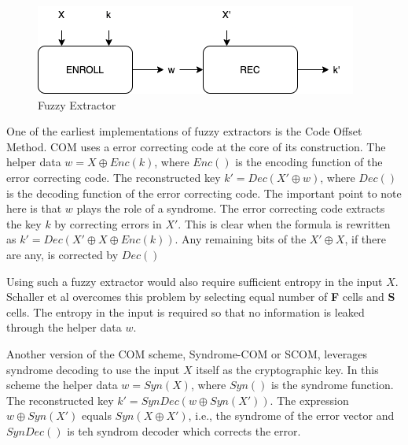 \documentclass[journal, a4paper]{IEEEtran}
\begin{document}
\begin{figure}[!hbt]
    \begin{center}
    \includegraphics[scale=0.45]{figs/COM.png}
    \caption{Fuzzy Extractor}
    \label{fig:tf_plot}
    \end{center}
\end{figure}

One of the earliest implementations of fuzzy extractors is the Code Offset Method. \cite{COM} COM uses a error correcting code at the core of its construction. The helper data \(w = X \oplus Enc(k)\), where \(Enc()\) is the encoding function of the error correcting code. The reconstructed key \(k' = Dec(X' \oplus w)\), where \(Dec()\) is the decoding function of the error correcting code. The important point to note here is that \(w\) plays the role of a syndrome. The error correcting code extracts the key \(k\) by correcting errors in \(X'\). This is clear when the formula is rewritten as \(k' = Dec(X' \oplus X \oplus Enc(k))\). Any remaining bits of the \(X' \oplus X\), if there are any, is corrected by \(Dec()\)

Using such a fuzzy extractor would also require sufficient entropy in the input \(X\). Schaller et al overcomes this problem by selecting equal number of \textbf{F} cells and \textbf{S} cells. The entropy in the input is required so that no information is leaked through the helper data \(w\).

Another version of the COM scheme, Syndrome-COM or SCOM,\cite{COM} leverages syndrome decoding to use the input \(X\) itself as the cryptographic key. In this scheme the helper data \(w = Syn(X)\), where \(Syn()\) is the syndrome function. The reconstructed key \(k' = SynDec(w \oplus Syn(X'))\). The expression \(w \oplus Syn(X')\) equals \(Syn(X \oplus X')\), i.e., the syndrome of the error vector and \(SynDec()\) is teh syndrom decoder which corrects the error.
\end{document}
